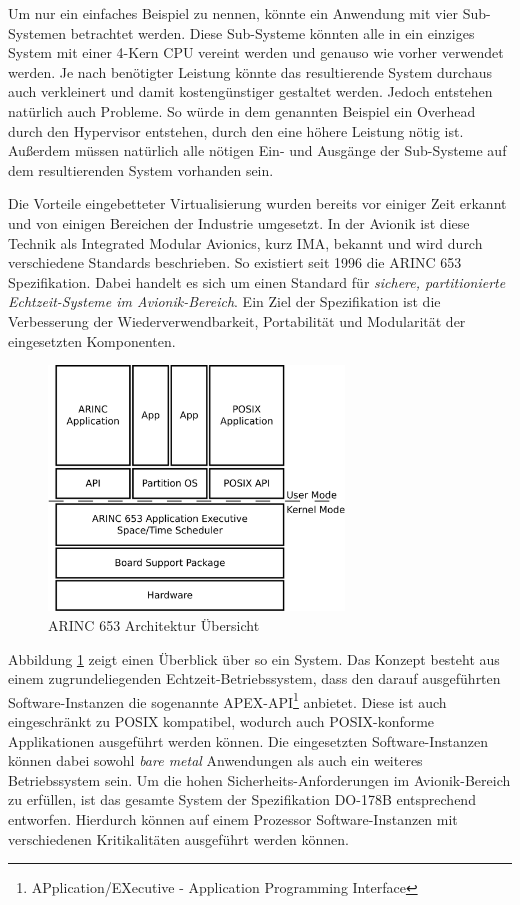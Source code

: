 \documentclass[
  a4paper,					    %
  twoside,
  DIV=calc,     				%
  bibliography=totoc,
  cleardoublepage=empty,
  ngerman,     					%
  final       					%
]{scrbook}
\begin{document}
Um nur ein einfaches Beispiel zu nennen, könnte ein Anwendung mit vier Sub-Systemen betrachtet werden. Diese Sub-Systeme könnten alle in ein einziges System mit einer 4-Kern CPU vereint werden und genauso wie vorher verwendet werden. Je nach benötigter Leistung könnte das resultierende System durchaus auch verkleinert und damit kostengünstiger gestaltet werden. Jedoch entstehen natürlich auch Probleme. So würde in dem genannten Beispiel ein Overhead durch den Hypervisor entstehen, durch den eine höhere Leistung nötig ist. Außerdem müssen natürlich alle nötigen Ein- und Ausgänge der Sub-Systeme auf dem resultierenden System vorhanden sein.

Die Vorteile eingebetteter Virtualisierung wurden bereits vor einiger Zeit erkannt und von einigen Bereichen der Industrie umgesetzt. In der Avionik ist diese Technik als Integrated Modular Avionics, kurz IMA, bekannt und wird durch verschiedene Standards beschrieben. So existiert seit 1996 die ARINC 653 Spezifikation. Dabei handelt es sich um einen Standard für \emph{sichere, partitionierte Echtzeit-Systeme im Avionik-Bereich}.\cite{arinc653_wr} Ein Ziel der Spezifikation ist die Verbesserung der Wiederverwendbarkeit, Portabilität und Modularität der eingesetzten Komponenten.

\begin{figure}[ht]
    \centering
    \includegraphics[width=0.7\textwidth]{arinc653.png}
    \caption[ARINC 653 Architektur Übersicht]{ARINC 653 Architektur Übersicht\cite{arinc653_wr}}
    \label{fig:arinc_653}
\end{figure}

Abbildung \ref{fig:arinc_653} zeigt einen Überblick über so ein System. Das Konzept besteht aus einem zugrundeliegenden Echtzeit-Betriebssystem, dass den darauf ausgeführten Software-Instanzen die sogenannte APEX-API\footnote{APplication/EXecutive - Application Programming Interface} anbietet. Diese ist auch eingeschränkt zu POSIX kompatibel\cite{wiki:arinc_653}, wodurch auch POSIX-konforme Applikationen ausgeführt werden können. Die eingesetzten Software-Instanzen können dabei sowohl \emph{bare metal} Anwendungen als auch ein weiteres Betriebssystem sein. Um die hohen Sicherheits-Anforderungen im Avionik-Bereich zu erfüllen, ist das gesamte System der Spezifikation DO-178B entsprechend entworfen. Hierdurch können auf einem Prozessor Software-Instanzen mit verschiedenen Kritikalitäten ausgeführt werden können. 
\end{document}
